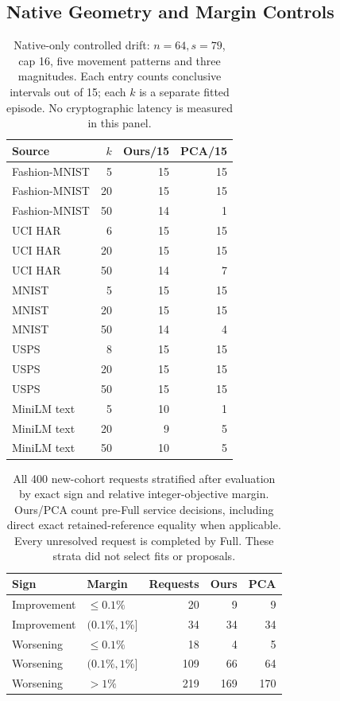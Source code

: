 \documentclass[5p,times,twocolumn]{elsarticle}
\begin{document}
\subsection{Native Geometry and Margin Controls}
\begin{table}[H]
\centering\small
\caption{Native-only controlled drift: $n=64,s=79$, cap 16, five movement patterns and three magnitudes. Each entry counts conclusive intervals out of 15; each $k$ is a separate fitted episode. No cryptographic latency is measured in this panel.}
\label{tab:final-drift}
\begin{tabular}{@{}lrrr@{}}\toprule
Source & $k$ & Ours/15 & PCA/15\\
\midrule
Fashion-MNIST & 5 & 15 & 15\\
Fashion-MNIST & 20 & 15 & 15\\
Fashion-MNIST & 50 & 14 & 1\\
UCI HAR & 6 & 15 & 15\\
UCI HAR & 20 & 15 & 15\\
UCI HAR & 50 & 14 & 7\\
MNIST & 5 & 15 & 15\\
MNIST & 20 & 15 & 15\\
MNIST & 50 & 14 & 4\\
USPS & 8 & 15 & 15\\
USPS & 20 & 15 & 15\\
USPS & 50 & 15 & 15\\
MiniLM text & 5 & 10 & 1\\
MiniLM text & 20 & 9 & 5\\
MiniLM text & 50 & 10 & 5\\
\bottomrule
\end{tabular}
\end{table}

\begin{table}[H]
\centering\small
\caption{All 400 new-cohort requests stratified after evaluation by exact sign and relative integer-objective margin. Ours/PCA count pre-Full service decisions, including direct exact retained-reference equality when applicable. Every unresolved request is completed by Full. These strata did not select fits or proposals.}
\label{tab:final-margins}
\begin{tabular}{@{}llrrr@{}}\toprule
Sign & Margin & Requests & Ours & PCA\\
\midrule
Improvement & $\leq 0.1\%$ & 20 & 9 & 9\\
Improvement & $(0.1\%,1\%]$ & 34 & 34 & 34\\
Worsening & $\leq 0.1\%$ & 18 & 4 & 5\\
Worsening & $(0.1\%,1\%]$ & 109 & 66 & 64\\
Worsening & $>1\%$ & 219 & 169 & 170\\
\bottomrule
\end{tabular}
\end{table}
\end{document}
